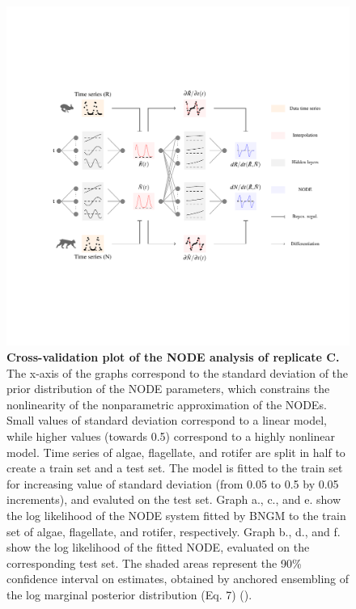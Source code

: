 \documentclass[11pt, oneside]{article}
\begin{document}
\newpage
\begin{figure}[H]
\includegraphics[width=1\linewidth,page=14]{figures/main.pdf}
\caption{
    \textbf{Cross-validation plot of the NODE analysis of replicate C.}
    The x-axis of the graphs correspond to the standard deviation of the prior distribution of the NODE parameters, which constrains the nonlinearity of the nonparametric approximation of the NODEs.
    Small values of standard deviation correspond to a linear model, while higher values (towards 0.5) correspond to a highly nonlinear model.
    Time series of algae, flagellate, and rotifer are split in half to create a train set and a test set. 
    The model is fitted to the train set for increasing value of standard deviation (from 0.05 to 0.5 by 0.05 increments), and evaluted on the test set.
    Graph a., c., and e. show the log likelihood of the NODE system fitted by BNGM to the train set of algae, flagellate, and rotifer, respectively.
    Graph b., d., and f. show the log likelihood of the fitted NODE, evaluated on the corresponding test set.
    The shaded areas represent the 90\% confidence interval on estimates, obtained by anchored ensembling of the log marginal posterior distribution (Eq. 7) (\cite{Pearce2018}).
}
\end{figure}
\newpage
\end{document}
